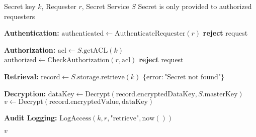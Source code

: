\begin{protocol}
\label{prot:secret-retrieval}
\begin{algorithmic}[1]
\Require Secret key $k$, Requester $r$, Secret Service $S$
\Ensure Secret is only provided to authorized requesters

\State \textbf{Authentication:}
\State $\text{authenticated} \gets \text{AuthenticateRequester}(r)$
    \State \textbf{reject} request
\EndIf

\State \textbf{Authorization:}
\State $\text{acl} \gets S.\text{getACL}(k)$
\State $\text{authorized} \gets \text{CheckAuthorization}(r, \text{acl})$
    \State \textbf{reject} request
\EndIf

\State \textbf{Retrieval:}
\State $\text{record} \gets S.\text{storage}.\text{retrieve}(k)$
    \State \Return $\{\text{error}: \text{"Secret not found"}\}$
\EndIf

\State \textbf{Decryption:}
\State $\text{dataKey} \gets \text{Decrypt}(\text{record}.\text{encryptedDataKey}, S.\text{masterKey})$
\State $v \gets \text{Decrypt}(\text{record}.\text{encryptedValue}, \text{dataKey})$

\State \textbf{Audit Logging:}
\State $\text{LogAccess}(k, r, \text{"retrieve"}, \text{now}())$

\State \Return $v$
\end{algorithmic}
\end{protocol}


